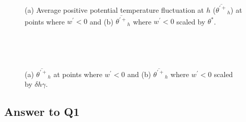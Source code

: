 \begin{figure}[htbp]
\begin{minipage}[b]{0.5\linewidth}
        \\
        \end{minipage}             
\quad
\begin{minipage}[b]{0.5\linewidth}
        \\      
       \end{minipage}
        \caption[Positive potential temperature fluctuation at $h$ (i)]{(a) Average positive potential temperature fluctuation at $h$ ($\overline{\theta^{\prime+}}_{h}$) at points where $w^{\prime}<0$ and (b) $\overline{\theta^{\prime+}}_{h}$ where $w^{\prime}<0$ scaled by $\theta^{*}$.}
        \label{fig:downwarm_theta}
\end{figure}


\begin{figure}[htbp]
\begin{minipage}[b]{0.5\linewidth}
        \\
        \end{minipage}             
\quad
\begin{minipage}[b]{0.5\linewidth}
        \\      
       \end{minipage}
        \caption[Positive potential temperature fluctuation at $h$ (ii)]{(a) $\overline{\theta^{\prime+}}_{h}$ at points where $w^{\prime}<0$ and (b) $\overline{\theta^{\prime+}}_{h}$ where $w^{\prime}<0$ scaled by $\delta h \gamma$.}
        \label{fig:downwarm_theta1}
\end{figure}
\clearpage
\subsection{Answer to Q1}

